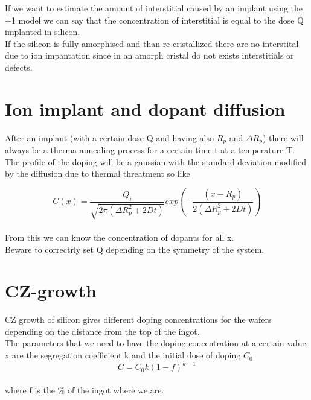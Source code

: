 \vspace{6mm}

If we want to estimate the amount of interstitial caused by an implant using the +1 model we can say that the concentration of interstitial is equal to the dose Q implanted in silicon.\\
If the silicon is fully amorphised and than re-cristallized there are no interstital due to ion impantation since in an amorph cristal do not exists interstitials or defects.\\












\section{Ion implant and dopant diffusion}

After an implant (with a certain dose Q and having also $R_p$ and $\Delta R_p$) there will always be a therma annealing process for a certain time t at a temperature T.\\
The profile of the doping will be a gaussian with the standard deviation modified by the diffusion due to thermal threatment so like

\begin{equation}
C(x)=\frac{Q_i}{\sqrt{2\pi (\Delta R_p^2+2Dt)}}exp\left(-\frac{(x-R_p)}{2(\Delta R_p^2+2Dt)}\right)
\end{equation} 
\\
From this we can know the concentration of dopants for all x.\\
Beware to correctrly set Q depending on the symmetry of the system.\\
























\section{CZ-growth}
CZ growth of silicon gives different doping concentrations for the wafers depending on the distance from the top of the ingot.\\
The parameters that we need to have the doping concentration at a certain value x are the segregation coefficient k and the initial dose of doping $C_0$
\begin{equation}
C=C_0 k (1-f)^{k-1}
\end{equation}
\\
where f is the \% of the ingot where we are.

